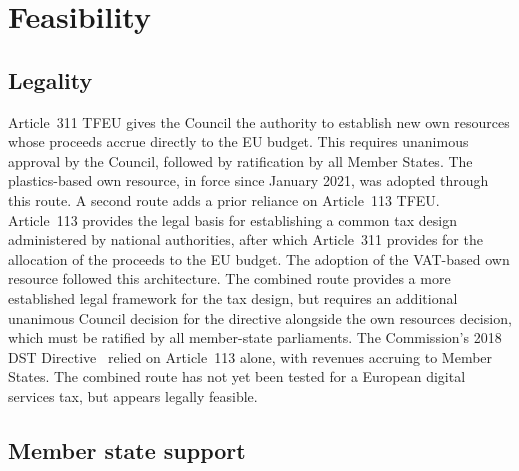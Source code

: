 \documentclass[../../main]{subfiles}
\begin{document}
\section{Feasibility}
\label{sec:feasibility}

\subsection{Legality}
\label{sec:feasibility:legal}


Article~311 TFEU gives the Council the authority to establish new own resources whose proceeds accrue directly to the EU budget.
This requires unanimous approval by the Council, followed by ratification by all Member States.
The plastics-based own resource, in force since January 2021, was adopted through this route.
A second route adds a prior reliance on Article~113 TFEU.
Article~113 provides the legal basis for establishing a common tax design administered by national authorities, after which Article~311 provides for the allocation of the proceeds to the EU budget.
The adoption of the VAT-based own resource followed this architecture.
The combined route provides a more established legal framework for the tax design, but requires an additional unanimous Council decision for the directive alongside the own resources decision, which must be ratified by all member-state parliaments.
The Commission's 2018 DST Directive~\citep{eu_commission_proposal} relied on Article~113 alone, with revenues accruing to Member States.
The combined route has not yet been tested for a European digital services tax, but appears legally feasible.



\subsection{Member state support}
\label{sec:feasibility:governments}
\end{document}
